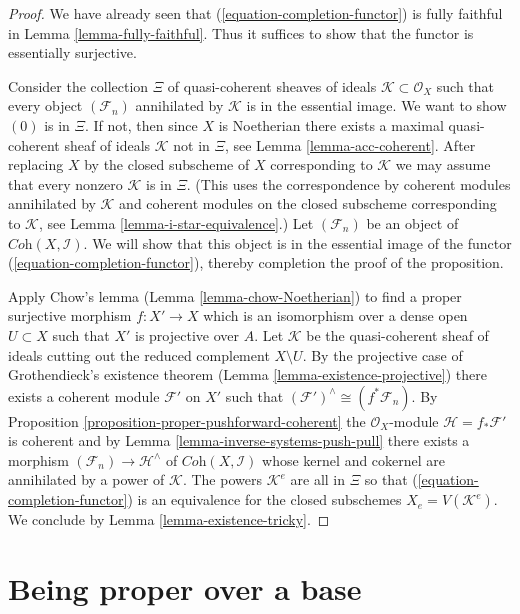 \documentclass{stacks-project}
\theoremstyle{plain}
\theoremstyle{definition}
\theoremstyle{remark}
\numberwithin{equation}{subsection}
\begin{document}
\begin{proof}
We have already seen that (\ref{equation-completion-functor}) is
fully faithful in Lemma \ref{lemma-fully-faithful}. Thus it suffices
to show that the functor is essentially surjective.

\medskip\noindent
Consider the collection $\Xi$ of quasi-coherent sheaves of ideals
$\mathcal{K} \subset \mathcal{O}_X$ such that every object
$(\mathcal{F}_n)$ annihilated by $\mathcal{K}$ is in the essential image.
We want to show $(0)$ is in $\Xi$. If not, then since $X$ is Noetherian
there exists a maximal quasi-coherent sheaf of ideals $\mathcal{K}$
not in $\Xi$, see
Lemma \ref{lemma-acc-coherent}.
After replacing $X$ by the closed subscheme of $X$
corresponding to $\mathcal{K}$ we may assume that every nonzero
$\mathcal{K}$ is in $\Xi$. (This uses the correspondence by
coherent modules annihilated by $\mathcal{K}$ and coherent modules
on the closed subscheme corresponding to $\mathcal{K}$, see
Lemma \ref{lemma-i-star-equivalence}.)
Let $(\mathcal{F}_n)$ be an object of
$\textit{Coh}(X, \mathcal{I})$.
We will show that this object is in the essential image of the
functor (\ref{equation-completion-functor}), thereby completion the
proof of the proposition.

\medskip\noindent
Apply Chow's lemma (Lemma \ref{lemma-chow-Noetherian}) to find a
proper surjective morphism $f : X' \to X$ which is an isomorphism
over a dense open $U \subset X$ such that $X'$ is projective over $A$.
Let $\mathcal{K}$ be the quasi-coherent sheaf of ideals cutting
out the reduced complement $X \setminus U$. By the projective
case of Grothendieck's existence theorem
(Lemma \ref{lemma-existence-projective})
there exists a coherent module $\mathcal{F}'$ on $X'$ such
that $(\mathcal{F}')^\wedge \cong (f^*\mathcal{F}_n)$. By
Proposition \ref{proposition-proper-pushforward-coherent}
the $\mathcal{O}_X$-module $\mathcal{H} = f_*\mathcal{F}'$ is coherent
and by Lemma \ref{lemma-inverse-systems-push-pull}
there exists a morphism $(\mathcal{F}_n) \to \mathcal{H}^\wedge$
of $\textit{Coh}(X, \mathcal{I})$ whose kernel and cokernel are
annihilated by a power of $\mathcal{K}$. The powers $\mathcal{K}^e$
are all in $\Xi$ so that (\ref{equation-completion-functor})
is an equivalence for the closed subschemes $X_e = V(\mathcal{K}^e)$.
We conclude by Lemma \ref{lemma-existence-tricky}.
\end{proof}





\section{Being proper over a base}
\label{section-proper-over-base}
\end{document}
